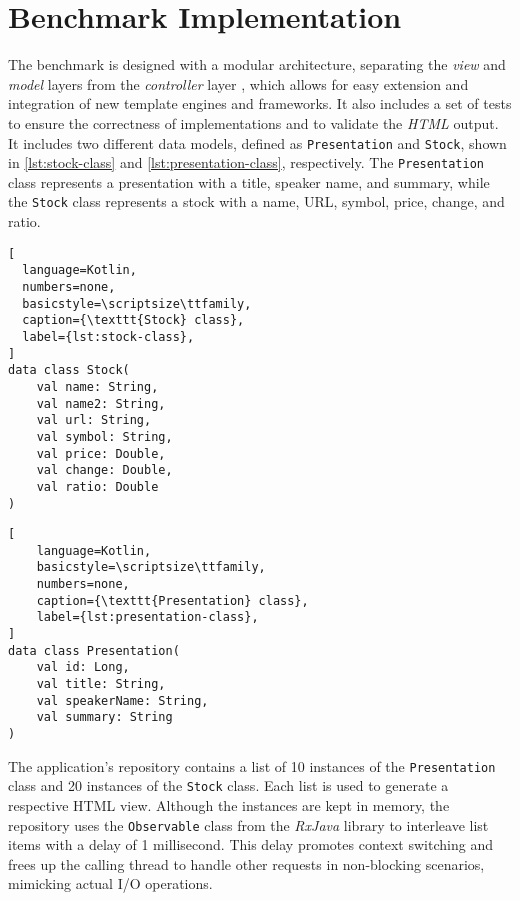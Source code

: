 \section{Benchmark Implementation}

The benchmark is designed with a modular architecture, separating the
\textit{view} and \textit{model} layers from the \textit{controller} layer
\cite{Bucanek2009}, which allows for easy extension and integration of new
template engines and frameworks. It also includes a set of tests to ensure the
correctness of implementations and to validate the \textit{HTML} output. It
includes two different data models, defined as \texttt{Presentation} and
\texttt{Stock}, shown in \autoref{lst:stock-class} and
\autoref{lst:presentation-class}, respectively. The \texttt{Presentation} class
represents a presentation with a title, speaker name, and summary, while the
\texttt{Stock} class represents a stock with a name, URL, symbol, price,
change, and ratio.

\lstset{style=listingstyle}
\begin{minipage}{0.5\textwidth}
  \begin{lstlisting}[
  language=Kotlin,
  numbers=none,
  basicstyle=\scriptsize\ttfamily,
  caption={\texttt{Stock} class},
  label={lst:stock-class},
]
data class Stock(
    val name: String,
    val name2: String,
    val url: String,
    val symbol: String,
    val price: Double, 
    val change: Double, 
    val ratio: Double
)
\end{lstlisting}
\end{minipage}
\hfill
\begin{minipage}{0.4\textwidth}
  \begin{lstlisting}[
    language=Kotlin,
    basicstyle=\scriptsize\ttfamily,
    numbers=none,
    caption={\texttt{Presentation} class},
    label={lst:presentation-class},
]
data class Presentation(
    val id: Long,
    val title: String, 
    val speakerName: String,
    val summary: String
)
\end{lstlisting}
\end{minipage}

The application's repository contains a list of 10 instances of the
\texttt{Presentation} class and 20 instances of the \texttt{Stock} class. Each
list is used to generate a respective HTML view. Although the instances are
kept in memory, the repository uses the \texttt{Observable} class from the
\textit{RxJava} library to interleave list items with a delay of 1 millisecond.
This delay promotes context switching and frees up the calling thread to handle
other requests in non-blocking scenarios, mimicking actual I/O operations.

